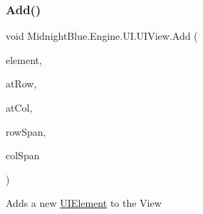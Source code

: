 \subsubsection{\texorpdfstring{Add()}{Add()}}
{\footnotesize\ttfamily void Midnight\+Blue.\+Engine.\+U\+I.\+U\+I\+View.\+Add (\begin{DoxyParamCaption}\item[{\hyperlink{class_midnight_blue_1_1_engine_1_1_u_i_1_1_u_i_element}{U\+I\+Element}}]{element,  }\item[{int}]{at\+Row,  }\item[{int}]{at\+Col,  }\item[{int}]{row\+Span,  }\item[{int}]{col\+Span }\end{DoxyParamCaption})\hspace{0.3cm}{\ttfamily [inline]}}



Adds a new \hyperlink{class_midnight_blue_1_1_engine_1_1_u_i_1_1_u_i_element}{U\+I\+Element} to the View 


